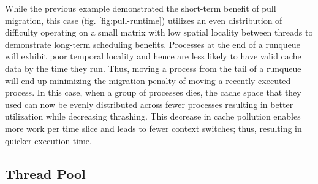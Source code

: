 \documentclass[11pt]{article}
\begin{document}
While the previous example demonstrated the short-term benefit of pull migration, this case (fig. \ref{fig:pull-runtime}) utilizes an even distribution of difficulty operating on a small matrix with low spatial locality between threads to demonstrate long-term scheduling benefits.  Processes at the end of a runqueue will exhibit poor temporal locality and hence are less likely to have valid cache data by the time they run.  Thus, moving a process from the tail of a runqueue will end up minimizing the migration penalty of moving a recently executed process.  In this case, when a group of processes dies, the cache space that they used can now be evenly distributed across fewer processes resulting in better utilization while decreasing thrashing.  This decrease in cache pollution enables more work per time slice and leads to fewer context switches; thus, resulting in quicker execution time.

\subsection{Thread Pool}
\end{document}

